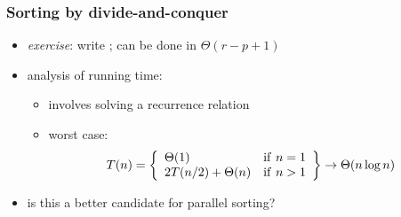\begin{frame}[fragile]
%
  \frametitle{Sorting by divide-and-conquer}
%
    \begin{center}
      \begin{minipage}{.75\linewidth}
        \begin{algorithm}[H]
          \label{alg:merge-sort}
%
          \DontPrintSemicolon
          \SetAlCapHSkip{0ex}
%
          \caption{\mergesort($S$, $p$, $r$)}
          \vspace{.5em}
%
%
          \vspace{.5em}
%
        \end{algorithm}
      \end{minipage}
    \end{center}
%
  \begin{itemize}
%
  \item {\em exercise}: write \merge; can be done in $\Theta(r-p+1)$
%
  \item analysis of running time:
    \begin{itemize}
    \item involves solving a recurrence relation
    \item worst case:
      \[
      T(n) = \left\{
      \begin{array}{ll}
        \Theta(1)         & {\rm if\ } n = 1 \\
        2T(n/2)+\Theta(n) & {\rm if\ } n > 1
      \end{array} \right\}
      \rightarrow \Theta(n \log n)
      \]
    \end{itemize}
%
  \item is this a better candidate for parallel sorting?
%
  \end{itemize}
%
\end{frame}

